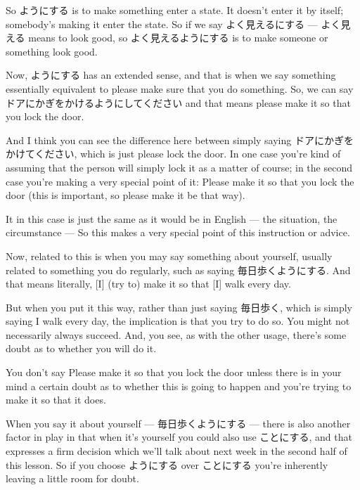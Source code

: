 {}

So ようにする is to make something enter a state. It doesn't enter it by itself; somebody's making it enter the state. So if we say よく見えるにする --- よく見える means to look good, so よく見えるようにする is to make someone or something look good.

Now, ようにする has an extended sense, and that is when we say something essentially equivalent to please make sure that you do something. So, we can say ドアにかぎをかけるようにしてください and that means please make it so that you lock the door.

{}

And I think you can see the difference here between simply saying ドアにかぎをかけてください, which is just please lock the door. In one case you're kind of assuming that the person will simply lock it as a matter of course; in the second case you're making a very special point of it: Please make it so that you lock the door (this is important, so please make it be that way).

It in this case is just the same as it would be in English --- the situation, the circumstance ---  So this makes a very special point of this instruction or advice.

Now, related to this is when you may say something about yourself, usually related to something you do regularly, such as saying 毎日歩くようにする. And that means literally, {[}I{]} (try to) make it so that {[}I{]} walk every day.

But when you put it this way, rather than just saying 毎日歩く, which is simply saying I walk every day, the implication is that you try to do so. You might not necessarily always succeed. And, you see, as with the other usage, there's some doubt as to whether you will do it.

You don't say Please make it so that you lock the door unless there is in your mind a certain doubt as to whether this is going to happen and you're trying to make it so that it does.

\stopsectionlevel

\startsectionlevel[title={ことにする},reference={ことにする}]

When you say it about yourself --- 毎日歩くようにする --- there is also another factor in play in that when it's yourself you could also use ことにする, and that expresses a firm decision which we'll talk about next week in the second half of this lesson. So if you choose ようにする over ことにする you're inherently leaving a little room for doubt.

